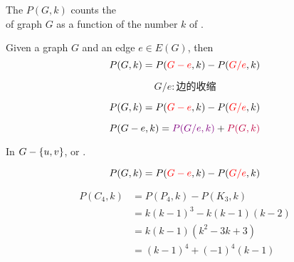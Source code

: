 \begin{frame}{}
\end{frame}

\begin{frame}{}
  \begin{definition}
    The  $P(G, k)$ counts the  \\
    of graph $G$ as a function of the number $k$ of .
  \end{definition}

  \pause
  \vspace{0.30cm}
\end{frame}

\begin{frame}{}
  \begin{theorem}
    Given a graph $G$ and an edge $e \in E(G)$, then
    \[
      P(G, k) = P(\textcolor{red}{G - e}, k) - P(\textcolor{red}{G/e}, k)
    \]
  \end{theorem}

  \[ G/e: \text{边的收缩} \]
\end{frame}

\begin{frame}{}
  \[
    P(G, k) = P(\textcolor{red}{G - e}, k) - P(\textcolor{red}{G/e}, k)
  \]

  \pause
  \[
    P(G - e, k) = \textcolor{violet}{P(G/e, k)} + \textcolor{purple}{P(G, k)}
  \]

  \begin{center}
    In $G - \{u, v\}$, 
    or .
  \end{center}
\end{frame}

\begin{frame}{}
  \[
    P(G, k) = P(\textcolor{red}{G - e}, k) - P(\textcolor{red}{G/e}, k)
  \]


  \pause
  \vspace{-0.80cm}
  \begin{align*}
    P(C_{4}, k) &= P(P_{4}, k) - P(K_{3}, k) \\[3pt]
    		&= k(k-1)^{3} - k(k-1)(k-2) \\[3pt]
		&= k(k-1)(k^2 - 3k + 3) \\[3pt]
		&= (k-1)^4 + (-1)^{4} (k-1)
  \end{align*}
\end{frame}
